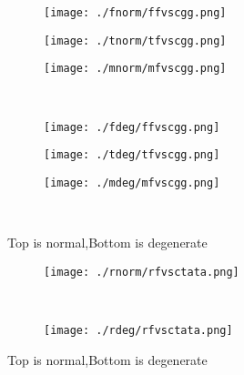 \documentclass[aps,floats,floatfix,nofootinbib]{revtex4-1}
\begin{document}
\begin{center}
\begin{figure}
\begin{subfigure}{0.3\textwidth}
\texttt{[image: ./fnorm/ffvscgg.png]}
\label{}
\end{subfigure}
\begin{subfigure}{0.3\textwidth}
\texttt{[image: ./tnorm/tfvscgg.png]}
\label{}
\end{subfigure}
\begin{subfigure}{0.3\textwidth}
\texttt{[image: ./mnorm/mfvscgg.png]}
\label{}
\end{subfigure}\\
\begin{subfigure}{0.3\textwidth}
\texttt{[image: ./fdeg/ffvscgg.png]}
\label{}
\end{subfigure}
\begin{subfigure}{0.3\textwidth}
\texttt{[image: ./tdeg/tfvscgg.png]}
\label{}
\end{subfigure}
\begin{subfigure}{0.3\textwidth}
\texttt{[image: ./mdeg/mfvscgg.png]}
\label{}
\end{subfigure}\\
\caption{Top is normal,Bottom is degenerate}
\end{figure}
\end{center}

\begin{center}
\begin{figure}
\begin{subfigure}{0.95\textwidth}
\texttt{[image: ./rnorm/rfvsctata.png]}
\label{}
\end{subfigure}\\
\begin{subfigure}{0.95\textwidth}
\texttt{[image: ./rdeg/rfvsctata.png]}
\label{}
\end{subfigure}
\caption{Top is normal,Bottom is degenerate}
\end{figure}
\end{center}
\end{document}
